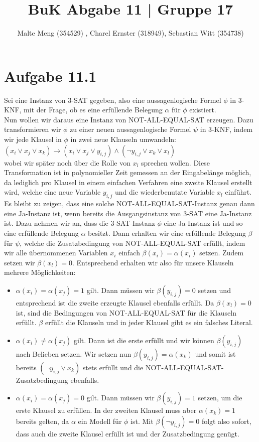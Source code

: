 \documentclass{article}
\title{BuK Abgabe 11 | Gruppe 17}
\author{Malte Meng (354529) , Charel Ernster (318949), Sebastian Witt (354738)}
\begin{document}
	\maketitle 
\section{Aufgabe 11.1}
Sei eine Instanz von 3-SAT gegeben, also eine aussagenlogische Formel $\phi$ in 3-KNF, mit der Frage, ob es eine erfüllende Belegung $\alpha$ für $\phi$ existiert.\\
Nun wollen wir daraus eine Instanz von NOT-ALL-EQUAL-SAT erzeugen. Dazu transformieren wir $\phi$ zu einer neuen aussagenlogische Formel $\psi$ in 3-KNF, indem wir jede Klausel in $\phi$ in zwei neue Klauseln umwandeln:\\

$(x_i \lor x_j \lor x_k) \rightarrow (x_i \lor x_j \lor y_{i,j}) \land (\lnot y_{i,j} \lor x_k \lor x_l)$\\

wobei wir später noch über die Rolle von $x_l$ sprechen wollen. Diese Transformation ist in polynomieller Zeit gemessen an der Eingabelänge möglich, da lediglich pro Klausel in einem einfachen Verfahren eine zweite Klausel erstellt wird, welche eine neue Variable $y_{i,j}$ und die wiederbenutzte Variable $x_l$ einführt.\\
Es bleibt zu zeigen, dass eine solche NOT-ALL-EQUAL-SAT-Instanz genau dann eine Ja-Instanz ist, wenn bereits die Ausgangsinstanz von 3-SAT eine Ja-Instanz ist. Dazu nehmen wir an, dass die 3-SAT-Instanz $\phi$ eine Ja-Instanz ist und so eine erfüllende Belegung $\alpha$ besitzt. Dann erhalten wir eine erfüllende Belegung $\beta$ für $\psi$, welche die Zusatzbedingung von NOT-ALL-EQUAL-SAT erfüllt, indem wir alle übernommenen Variablen $x_i$ einfach $\beta (x_i) = \alpha (x_i)$ setzen. Zudem setzen wir $\beta (x_l)=0$. Entsprechend erhalten wir also für unsere Klauseln mehrere Möglichkeiten:\\

\begin{itemize}
\item $\alpha(x_i)=\alpha(x_j)=1$ gilt. Dann müssen wir $\beta(y_{i,j})=0$ setzen und entsprechend ist die zweite erzeugte Klausel ebenfalls erfüllt. Da $\beta(x_l)=0$ ist, sind die Bedingungen von NOT-ALL-EQUAL-SAT für die Klauseln erfüllt. $\beta$ erfüllt die Klauseln und in jeder Klausel gibt es ein falsches Literal.
\item $\alpha(x_i)\neq \alpha(x_j)$ gilt. Dann ist die erste erfüllt und wir können $\beta(y_{i,j})$ nach Belieben setzen. Wir setzen nun $\beta(y_{i,j}) = \alpha(x_k)$ und somit ist bereits $(\lnot y_{i,j} \lor x_k)$ stets erfüllt und die NOT-ALL-EQUAL-SAT-Zusatzbedingung ebenfalls.
\item $\alpha(x_i)=\alpha(x_j)=0$ gilt. Dann müssen wir $\beta (y_{i,j})=1$ setzen, um die erste Klausel zu erfüllen. In der zweiten Klausel muss aber $\alpha(x_k)=1$ bereits gelten, da $\alpha$ ein Modell für $\phi$ ist. Mit $\beta (\lnot y_{i,j})=0$ folgt also sofort, dass auch die zweite Klausel erfüllt ist und der Zusatzbedingung genügt.
\end{itemize}
\end{document}
